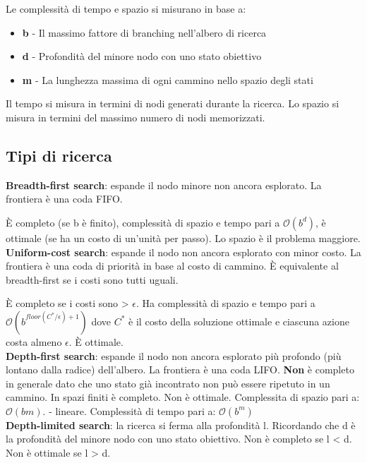 Le complessità di tempo e spazio si misurano in base a:

\begin{itemize}
\item \textbf{b} - Il massimo fattore di branching nell'albero di ricerca
\item \textbf{d} - Profondità del minore nodo con uno stato obiettivo
\item \textbf{m} - La lunghezza massima di ogni cammino nello spazio degli stati
\end{itemize}

Il tempo si misura in termini di nodi generati durante la ricerca.
Lo spazio si misura in termini del massimo numero di nodi memorizzati.\\

\subsection{Tipi di ricerca}

\textbf{Breadth-first search}: espande il nodo minore non ancora esplorato.
La frontiera è una coda FIFO.

È completo (se b è finito), complessità di spazio e tempo pari a $\mathcal{O}(b^d)$,
è ottimale (se ha un costo di un'unità per passo).
Lo spazio è il problema maggiore.\\

\textbf{Uniform-cost search}: espande il nodo non ancora esplorato con minor costo.
La frontiera è una coda di priorità in base al costo di cammino.
È equivalente al breadth-first se i costi sono tutti uguali.

È completo se i costi sono > $\epsilon$. Ha complessità di spazio e tempo pari a
$\mathcal{O}(b^{floor(C^*/\epsilon)+1})$ dove $C^*$ è il costo della soluzione
ottimale e ciascuna azione costa almeno $\epsilon$. È ottimale.\\

\textbf{Depth-first search}: espande il nodo non ancora esplorato più profondo
(più lontano dalla radice) dell'albero. La frontiera è una coda LIFO.
\textbf{Non} è completo in generale dato che uno stato già incontrato non può
essere ripetuto in un cammino. In spazi finiti è completo. Non è ottimale.
Complessita di spazio pari a: $\mathcal{O}(bm).$ - lineare.
Complessità di tempo pari a: $\mathcal{O}(b^m)$\\

\textbf{Depth-limited search}: la ricerca si ferma alla profondità l.
Ricordando che d è la profondità del minore nodo con uno stato obiettivo.
Non è completo se l < d.
Non è ottimale se l > d.\\

